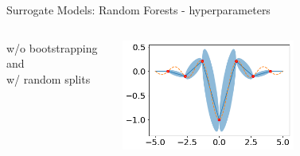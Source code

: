 \begin{frame}[c]{Surrogate Models: Random Forests - hyperparameters}
\begin{columns}
	w/o bootstrapping and\\ w/ random splits
	
	\includegraphics[width=0.6\textwidth]{images/surrogate_models/rf_noboot_rand_split.png}
	
\end{columns}

\end{frame}

